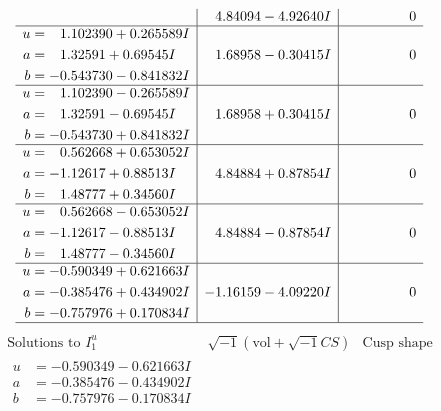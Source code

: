 \documentclass[1p]{elsarticle_modified}
\theoremstyle{definition}
\newcommand{\I}{\sqrt{-1}}
\begin{document}
$$\begin{array}{c|c|c}
 & \phantom{-}4.84094 - 4.92640 I & \phantom{-0.000000 } 0 \\ \hline\begin{aligned}
u &= \phantom{-}1.102390 + 0.265589 I \\
a &= \phantom{-}1.32591 + 0.69545 I \\
b &= -0.543730 - 0.841832 I\end{aligned}
 & \phantom{-}1.68958 - 0.30415 I & \phantom{-0.000000 } 0 \\ \hline\begin{aligned}
u &= \phantom{-}1.102390 - 0.265589 I \\
a &= \phantom{-}1.32591 - 0.69545 I \\
b &= -0.543730 + 0.841832 I\end{aligned}
 & \phantom{-}1.68958 + 0.30415 I & \phantom{-0.000000 } 0 \\ \hline\begin{aligned}
u &= \phantom{-}0.562668 + 0.653052 I \\
a &= -1.12617 + 0.88513 I \\
b &= \phantom{-}1.48777 + 0.34560 I\end{aligned}
 & \phantom{-}4.84884 + 0.87854 I & \phantom{-0.000000 } 0 \\ \hline\begin{aligned}
u &= \phantom{-}0.562668 - 0.653052 I \\
a &= -1.12617 - 0.88513 I \\
b &= \phantom{-}1.48777 - 0.34560 I\end{aligned}
 & \phantom{-}4.84884 - 0.87854 I & \phantom{-0.000000 } 0 \\ \hline\begin{aligned}
u &= -0.590349 + 0.621663 I \\
a &= -0.385476 + 0.434902 I \\
b &= -0.757976 + 0.170834 I\end{aligned}
 & -1.16159 - 4.09220 I & \phantom{-0.000000 } 0\\
 \hline 
 \end{array}$$\newpage$$\begin{array}{c|c|c}  
\text{Solutions to }I^u_{1}& \I (\text{vol} + \sqrt{-1}CS) & \text{Cusp shape}\\
 \hline 
\begin{aligned}
u &= -0.590349 - 0.621663 I \\
a &= -0.385476 - 0.434902 I \\
b &= -0.757976 - 0.170834 I\end{aligned}

\end{array}$$
\end{document}
